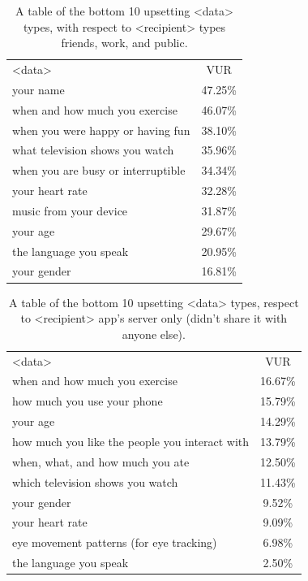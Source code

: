 \documentclass{acm_proc_article-sp}
\begin{document}
\begin{table}[t]
\begin{center}
\begin{tabular}{| l | c |}
<data> &  VUR  \\
your name & 47.25\% \\
when and how much you exercise & 46.07\% \\
when you were happy or having fun & 38.10\% \\
what television shows you watch & 35.96\% \\
when you are busy or interruptible & 34.34\% \\
your heart rate & 32.28\% \\
music from your device & 31.87\% \\
your age & 29.67\% \\
the language you speak & 20.95\% \\
your gender & 16.81\% \\
\end{tabular}
\caption{A table of the bottom 10 upsetting <data> types, with respect to <recipient> types friends, work, and public.}
\label{sharedbottom10}
\end{center}
\end{table}


\begin{table}[t]
\begin{center}
\begin{tabular}{| l | c |}
<data> &  VUR  \\
when and how much you exercise & 16.67\% \\
how much you use your phone & 15.79\% \\
your age & 14.29\% \\
how much you like the people you interact with & 13.79\% \\
when, what, and how much you ate & 12.50\% \\
which television shows you watch & 11.43\% \\
your gender & 9.52\% \\
your heart rate & 9.09\% \\
eye movement patterns (for eye tracking) & 6.98\% \\
the language you speak & 2.50\% \\
\end{tabular}
\caption{A table of the bottom 10 upsetting <data> types, respect to <recipient> app's server only (didn't share it with anyone else).}
\label{notsharedbottom10}
\end{center}
\end{table}
\end{document}

